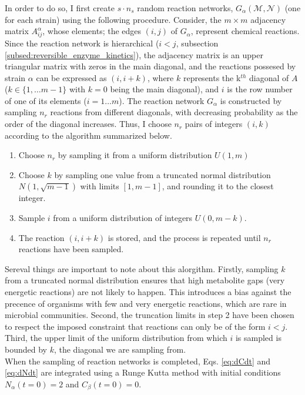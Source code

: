 \documentclass[titlepage,11pt]{article}
\begin{document}
\begin{linenumbers}
\begin{singlespace}
				In order to do so, I first create $ s \cdot n_{s}  $ random reaction networks, $ G_{\alpha}(\mathcal{M}, \mathcal{N}) $ (one for each strain) using the following  procedure. Consider, the $ m \times m $ adjacency matrix $ A^{\alpha}_{ij} $, whose elements; the edges $ (i, j) $ of $ G_{\alpha}$, represent chemical reactions. Since the reaction network is hierarchical ($ i < j $, subsection \ref{subsed:reversible_enzyme_kinetics}), the adjacency matrix is an upper triangular matrix with zeros in the main diagonal, and the reactions possesed by strain $ \alpha $ can be expressed as $ (i, i + k) $, where $ k $ represents the k$ ^{th} $ diagonal of $ A $ ($ k \in \{1, \dots m - 1 \}$ with $ k = 0 $ being the main diagonal), and $ i $ is the row number of one of its elements ($ i = 1 \dots m $). The reaction network $ G_{\alpha} $ is constructed by sampling $ n_{r} $ reactions from  different diagonals, with decreasing probability as the order of the diagonal increases. Thus, I choose $ n_{r} $ pairs of integers $ (i , k )$ according to the algorithm summarized below.	
				\begin{enumerate}
					\item Choose $ n_{r} $ by sampling it from a uniform distribution $ U \left(1, {m}\right) $
					\item \sloppy Choose $ k $  by sampling one value from a truncated normal distribution $N\left(1,  \sqrt {m - 1}\right)$ with limits $ [1, m-1] $, and rounding it to the closest integer.
					\item Sample $ i $ from a uniform distribution of integers $ U(0, m-k) $.
					\item The reaction $ (i, i + k) $ is stored, and the process is repeated until $ n_{r} $ reactions have been sampled.
				\end{enumerate}
				Sereval things are important to note about this alorgithm. Firstly, sampling $ k $ from a truncated normal distribution ensures that high metabolite gaps (very energetic reactions) are not likely to happen. This introduces a bias against the precence of organisms with few and very energetic reactions, which are rare in microbial communities. Second, the truncation limits in step 2 have been chosen to respect the imposed constraint that reactions can only be of the form $ i < j $. Third, the upper limit of the uniform distribution from which $ i $ is sampled is bounded by $ k $, the diagonal we are sampling from. \\
				When the sampling of reaction networks is completed, Eqs. \ref{eq:dCdt} and \ref{eq:dNdt} are integrated using a Runge Kutta method \citep{Dormand1980} with initial conditions $ N_{\alpha}(t = 0) = 2 $ and $ C_{\beta}(t = 0) = 0 $. \\


\end{singlespace}
\end{linenumbers}
\end{document}
